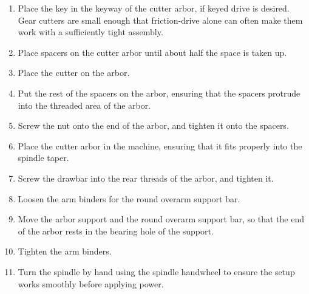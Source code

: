 \documentclass[12pt,twoside,letterpaper]{article}
\begin{document}
\begin{enumerate}
	\item Place the key in the keyway of the cutter arbor, if keyed drive is desired. Gear cutters are small enough that friction-drive alone can often make them work with a sufficiently tight assembly.
	\item Place spacers on the cutter arbor until about half the space is taken up.
	\item Place the cutter on the arbor.
	\item Put the rest of the spacers on the arbor, ensuring that the spacers protrude into the threaded area of the arbor.
	\item Screw the nut onto the end of the arbor, and tighten it onto the spacers.
	\item Place the cutter arbor in the machine, ensuring that it fits properly into the spindle taper.
	\item Screw the drawbar into the rear threads of the arbor, and tighten it.
	\item Loosen the arm binders for the round overarm support bar.
	\item Move the arbor support and the round overarm support bar, so that the end of the arbor rests in the bearing hole of the support.
	\item Tighten the arm binders.
	\item Turn the spindle by hand using the spindle handwheel to ensure the setup works smoothly before applying power. 
\end{enumerate}
\end{document}
